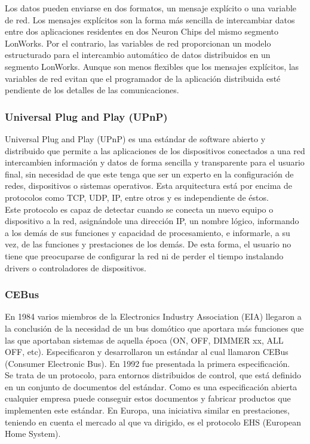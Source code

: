 Los datos pueden enviarse en dos formatos, un mensaje explícito o una variable de red. Los mensajes explícitos son la forma más sencilla de intercambiar datos entre dos aplicaciones residentes en dos Neuron Chips del mismo segmento LonWorks. Por el contrario, las variables de red proporcionan un modelo estructurado para el intercambio automático de datos distribuidos en un segmento LonWorks. Aunque son menos flexibles que los mensajes explícitos, las variables de red evitan que el programador de la aplicación distribuida esté pendiente de los detalles de las comunicaciones.\cite{iecor}

\subsubsection{Universal Plug and Play (UPnP)}
Universal Plug and Play (UPnP) es una estándar de software abierto y distribuido que permite a las aplicaciones de los dispositivos conectados a una red intercambien información y datos de forma sencilla y transparente para el usuario final, sin necesidad de que este tenga que ser un experto en la configuración de redes, dispositivos o sistemas operativos. Esta arquitectura está por encima de protocolos como TCP, UDP, IP, entre otros y es independiente de éstos.\\

Este protocolo es capaz de detectar cuando se conecta un nuevo equipo o dispositivo a la red, asignándole una dirección IP, un nombre lógico, informando a los demás de sus funciones y capacidad de procesamiento, e informarle, a su vez, de las funciones y prestaciones de los demás. De esta forma, el usuario no tiene que preocuparse de configurar la red ni de perder el tiempo instalando drivers o controladores de dispositivos.\cite{domoticaoviedo}

\subsubsection{CEBus}
En 1984 varios miembros de la Electronics Industry Association (EIA) llegaron a la conclusión de la necesidad de un bus domótico que aportara más funciones que las que aportaban sistemas de aquella época (ON, OFF, DIMMER xx, ALL OFF, etc). Especificaron y desarrollaron un estándar al cual llamaron CEBus (Consumer Electronic Bus). En 1992 fue presentada la primera especificación.\\

Se trata de un protocolo, para entornos distribuidos de control, que está definido en un conjunto de documentos del estándar. Como es una especificación abierta cualquier empresa puede conseguir estos documentos y fabricar productos que implementen este estándar. En Europa, una iniciativa similar en prestaciones, teniendo en cuenta el mercado al que va dirigido, es el protocolo EHS (European Home System).\\

